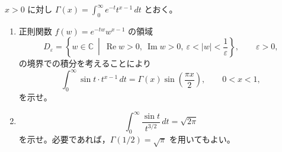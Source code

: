 \documentclass[12pt]{jlreq}
\newcommand{\C}{\mathbb{C}}
\newcommand{\dd}{\,d}
\begin{document}
\(x>0\) に対し \(\Gamma(x)=\displaystyle\int_0^\infty e^{-t}t^{x-1}\dd t\) とおく。

\begin{enumerate}
  \item 正則関数 \(f(w)=e^{-tw}w^{x-1}\) の領域
  \[
    D_\varepsilon=\left\{w\in\C\ \middle|\ \operatorname{Re}w>0,\ \operatorname{Im}w>0,\ \varepsilon<|w|<\frac1\varepsilon\right\},\qquad \varepsilon>0,
  \]
  の境界での積分を考えることにより
  \[
    \int_0^\infty \sin t\cdot t^{x-1}\dd t
    =\Gamma(x)\sin\left(\frac{\pi x}{2}\right),\qquad 0<x<1,
  \]
  を示せ。
  \item
  \[
    \int_0^\infty \frac{\sin t}{t^{3/2}}\dd t=\sqrt{2\pi}
  \]
  を示せ。必要であれば，\(\Gamma(1/2)=\sqrt{\pi}\) を用いてもよい。
\end{enumerate}
\end{document}
